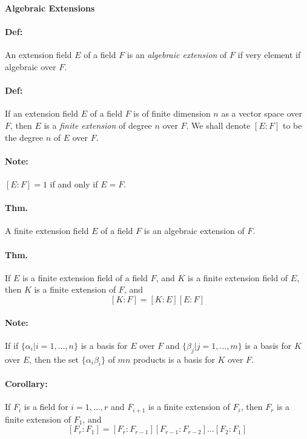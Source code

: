 \documentclass[10pt,a4paper]{article}
\begin{document}
\begin{center}
\textbf{Algebraic Extensions}
\end{center}

\paragraph{Def:} An extension field $E$ of a field $F$ is an \textit{algebraic extension} of $F$ if very element if algebraic over $F$.

\paragraph{Def:} If an extension field $E$ of a field $F$ is of finite dimension $n$ as a vector space over $F$, then $E$ is a \textit{finite extension} of degree $n$ over $F$. We shall denote $[E:F]$ to be the degree $n$ of $E$ over $F$.

\paragraph{Note:} $[E:F] = 1$ if and only if $E=F$.

\paragraph{Thm.} A finite extension field $E$ of a field $F$ is an algebraic extension of $F$.

\paragraph{Thm.}  If $E$ is a finite extension field of a field $F$, and $K$ is a finite extension field of $E$, then $K$ is a finite extension of $F$, and 
$$ [K:F] = [K:E][E:F]$$

\paragraph{Note:} If if $\{ \alpha_i | i = 1,\dots,n\}$ is a basis for $E$ over $F$ and $\{ \beta_j | j=1,\dots,m\}$ is a basis for $K$ over $E$, then the set $\{\alpha_i\beta_i\}$ of $mn$ products is a basis for $K$ over $F$.

\paragraph{Corollary:} If $F_i$ is a field for $i=1,\dots,r$ and $F_{i+1}$ is a finite extension of $F_i$, then $F_r$ is a finite extension of $F_1$, and
$$ [F_r:F_1] = [F_r:F_{r-1}][F_{r-1}:F_{r-2}]\dots[F_2:F_1]$$
\end{document}
